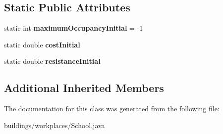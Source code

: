 \subsection*{Static Public Attributes}
\begin{DoxyCompactItemize}
\item 
static int {\bfseries maximum\+Occupancy\+Initial} = -\/1\hypertarget{classbuildings_1_1workplaces_1_1_school_aa4bee05f4ee0bfc49440fe21cd18aac4}{}\label{classbuildings_1_1workplaces_1_1_school_aa4bee05f4ee0bfc49440fe21cd18aac4}

\item 
static double {\bfseries cost\+Initial}\hypertarget{classbuildings_1_1workplaces_1_1_school_ac0567a3c4fc84cf8029ebd7c9bc26a67}{}\label{classbuildings_1_1workplaces_1_1_school_ac0567a3c4fc84cf8029ebd7c9bc26a67}

\item 
static double {\bfseries resistance\+Initial}\hypertarget{classbuildings_1_1workplaces_1_1_school_af86e5847725912b82234395586f7216d}{}\label{classbuildings_1_1workplaces_1_1_school_af86e5847725912b82234395586f7216d}

\end{DoxyCompactItemize}
\subsection*{Additional Inherited Members}


The documentation for this class was generated from the following file\+:\begin{DoxyCompactItemize}
\item 
buildings/workplaces/School.\+java\end{DoxyCompactItemize}
